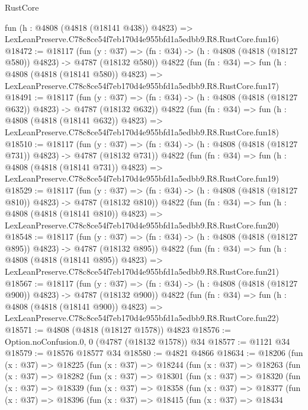 \begin{lexlean}{RustCore}
\begin{coremodule}
    fun (h : @4808 (@4818 (@18141 @438)) @4823) =>
    LexLeanPreserve.C78c8ce54f7eb170d4e955bfd1a5edbb9.R8.RustCore.fun16)
@18472 := @18117
    (fun (y : @37) => (fn : @34) -> (h : @4808 (@4818 (@18127 @580)) @4823) -> @4787 (@18132 @580))
    @4822
    (fun (fn : @34) =>
    fun (h : @4808 (@4818 (@18141 @580)) @4823) =>
    LexLeanPreserve.C78c8ce54f7eb170d4e955bfd1a5edbb9.R8.RustCore.fun17)
@18491 := @18117
    (fun (y : @37) => (fn : @34) -> (h : @4808 (@4818 (@18127 @632)) @4823) -> @4787 (@18132 @632))
    @4822
    (fun (fn : @34) =>
    fun (h : @4808 (@4818 (@18141 @632)) @4823) =>
    LexLeanPreserve.C78c8ce54f7eb170d4e955bfd1a5edbb9.R8.RustCore.fun18)
@18510 := @18117
    (fun (y : @37) => (fn : @34) -> (h : @4808 (@4818 (@18127 @731)) @4823) -> @4787 (@18132 @731))
    @4822
    (fun (fn : @34) =>
    fun (h : @4808 (@4818 (@18141 @731)) @4823) =>
    LexLeanPreserve.C78c8ce54f7eb170d4e955bfd1a5edbb9.R8.RustCore.fun19)
@18529 := @18117
    (fun (y : @37) => (fn : @34) -> (h : @4808 (@4818 (@18127 @810)) @4823) -> @4787 (@18132 @810))
    @4822
    (fun (fn : @34) =>
    fun (h : @4808 (@4818 (@18141 @810)) @4823) =>
    LexLeanPreserve.C78c8ce54f7eb170d4e955bfd1a5edbb9.R8.RustCore.fun20)
@18548 := @18117
    (fun (y : @37) => (fn : @34) -> (h : @4808 (@4818 (@18127 @895)) @4823) -> @4787 (@18132 @895))
    @4822
    (fun (fn : @34) =>
    fun (h : @4808 (@4818 (@18141 @895)) @4823) =>
    LexLeanPreserve.C78c8ce54f7eb170d4e955bfd1a5edbb9.R8.RustCore.fun21)
@18567 := @18117
    (fun (y : @37) => (fn : @34) -> (h : @4808 (@4818 (@18127 @900)) @4823) -> @4787 (@18132 @900))
    @4822
    (fun (fn : @34) =>
    fun (h : @4808 (@4818 (@18141 @900)) @4823) =>
    LexLeanPreserve.C78c8ce54f7eb170d4e955bfd1a5edbb9.R8.RustCore.fun22)
@18571 := @4808 (@4818 (@18127 @1578)) @4823
@18576 := Option.noConfusion.{0, 0} (@4787 (@18132 @1578)) @34
@18577 := @1121 @34
@18579 := @18576 @18577 @34
@18580 := @4821 @4866
@18634 := @18206
    (fun (x : @37) =>
    @18225
      (fun (x : @37) =>
      @18244
        (fun (x : @37) =>
        @18263
          (fun (x : @37) =>
          @18282
            (fun (x : @37) =>
            @18301
              (fun (x : @37) =>
              @18320
                (fun (x : @37) =>
                @18339
                  (fun (x : @37) =>
                  @18358
                    (fun (x : @37) =>
                    @18377
                      (fun (x : @37) =>
                      @18396
                        (fun (x : @37) =>
                        @18415
                          (fun (x : @37) =>
                          @18434

\end{coremodule}
\end{lexlean}
